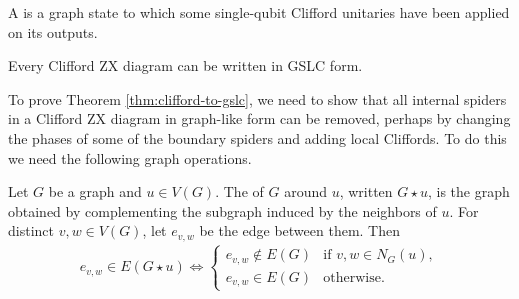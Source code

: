 

\begin{definition}
\label{def:gslc}
A  is a graph state to which some single-qubit Clifford unitaries have been applied on its outputs.
\end{definition}

\begin{theorem}
\label{thm:clifford-to-gslc}
Every Clifford ZX diagram can be written in GSLC form.
\end{theorem}

To prove Theorem \ref{thm:clifford-to-gslc}, we need to show that all internal spiders in a Clifford ZX diagram in graph-like form can be removed, perhaps by changing the phases of some of the boundary spiders and adding local Cliffords. To do this we need the following graph operations.

\begin{definition}
Let $G$ be a graph and $u \in V(G)$. The  of $G$ around $u$, written $G \star u$, is the graph obtained by complementing the subgraph induced by the neighbors of $u$. For distinct $v,w \in V(G)$, let $e_{v,w}$ be the edge between them. Then 
\begin{align}
    e_{v,w} \in E(G \star u) \iff \begin{cases}
        e_{v,w} \notin E(G) & \text{if } v,w \in N_G(u), \\
        e_{v,w} \in E(G) & \text{otherwise.}
    \end{cases}
\end{align}
\end{definition}

